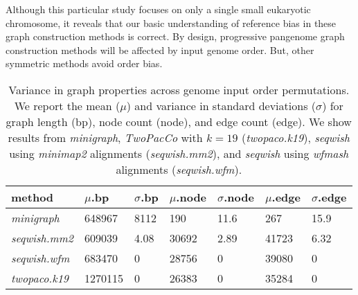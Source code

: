 \documentclass{bioinfo}
\theoremstyle{definition}
\newcommand{\red}[1]{{\textcolor{Red}{#1}}}
\newcommand{\FIXME}[1]{\red{[FIXME: #1]}}
\begin{document}
Although this particular study focuses on only a single small eukaryotic chromosome, it reveals that our basic understanding of reference bias in these graph construction methods is correct.
By design, progressive pangenome graph construction methods will be affected by input genome order.
But, other symmetric methods avoid order bias.



\begin{table}[!h]
    \centering
    \caption{Variance in graph properties across genome input order permutations.
    We report the mean ($\mu$) and variance in standard deviations ($\sigma$) for graph length (bp), node count (node), and edge count (edge).
    We show results from \textit{minigraph}, \textit{TwoPacCo} with $k=19$ (\textit{twopaco.k19}), \textit{seqwish} using \textit{minimap2} alignments (\textit{seqwish.mm2}), and \textit{seqwish} using \textit{wfmash} alignments (\textit{seqwish.wfm}).
        }
    \label{tab:yeast}
    \begin{tabular}{|l|l|l|l|l|l|l|}
        \hline
        method & $\mu$.bp & $\sigma$.bp & $\mu$.node & $\sigma$.node & $\mu$.edge & $\sigma$.edge \\ \hline
        \textit{minigraph} &  648967 & 8112 & 190 & 11.6 & 267 & 15.9 \\ \hline
        \textit{seqwish.mm2}  & 609039  &  4.08 & 30692 &  2.89 &  41723  &  6.32 \\ \hline
        \textit{seqwish.wfm}  & 683470 & 0 & 28756 & 0 & 39080 & 0 \\ \hline
        \textit{twopaco.k19} & 1270115 & 0 & 26383 & 0 & 35284 & 0 \\ \hline
    \end{tabular}
\end{table}


\end{document}
